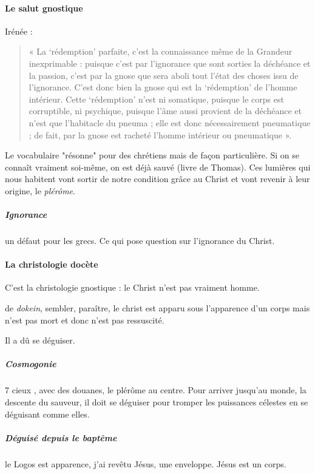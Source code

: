       \paragraph{Le salut gnostique}
      Irénée  : 
    \begin{quote}
       

« La `rédemption' parfaite, c'est la connaissance même de la Grandeur
inexprimable : puisque c'est par l'ignorance que sont sorties la
déchéance et la passion, c'est par la gnose que sera aboli tout l'état
des choses issu de l'ignorance. C'est donc bien la gnose qui est la
`rédemption' de l'homme intérieur. Cette `rédemption' n'est ni
somatique, puisque le corps est corruptible, ni psychique, puisque l'âme
aussi provient de la déchéance et n'est que l'habitacle du pneuma ; elle
est donc nécessairement pneumatique ; de fait, par la gnose est racheté
l'homme intérieur ou pneumatique ».

    \end{quote}
      Le vocabulaire "résonne" pour des chrétiens mais de façon particulière.
      Si on se connaît vraiment soi-même, on est déjà sauvé (livre de Thomas). 
      Ces lumières qui nous habitent vont sortir de notre condition grâce au Christ et vont revenir à leur origine, le \textit{plérôme}.
      
      \subparagraph{Ignorance} un défaut pour les grecs. Ce qui pose question sur l'ignorance du Christ.
      
      \paragraph{La christologie docète}
      C'est la christologie gnostique : le Christ n'est pas vraiment homme.
      \begin{Def}[docétisme]
          de \emph{dokein}, sembler, paraître, le christ est apparu sous l'apparence d'un corps mais n'est pas mort et donc n'est pas ressuscité.
      \end{Def}
      Il a dû se déguiser.
      
      \subparagraph{Cosmogonie} 7 cieux , avec des douanes, le plérôme au centre. Pour arriver jusqu'au monde, la descente du sauveur, il doit se déguiser pour tromper les puissances célestes en se déguisant comme elles.
      
      \subparagraph{Déguisé depuis le baptême} le Logos est apparence, j'ai revêtu Jésus, une enveloppe. Jésus est un corps.
  
